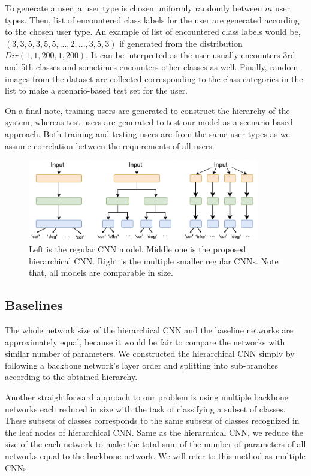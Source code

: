 To generate a user, a user type is chosen uniformly randomly between $m$ user types. 
Then, list of encountered class labels for the user are generated according to the chosen user type. 
An example of list of encountered class labels would be, $(3,3,5,3,5,5,...,2,...,3,5,3)$ if generated from the distribution $Dir(1,1,200,1,200)$. 
It can be interpreted as the user usually encounters 3rd and 5th classes and sometimes encounters other classes as well.
Finally, random images from the dataset are collected corresponding to the class categories in the list to make a scenario-based test set for the user.

On a final note, training users are generated to construct the hierarchy of the system, whereas test users are generated to test our model as a scenario-based approach. 
Both training and testing users are from the same user types as we assume correlation between the requirements of all users. 

\begin{figure}
    \centering
    \includegraphics[width=0.9\textwidth]{thesis/images/classification_baselines-fig.png}
    \caption{Left is the regular CNN model. Middle one is the proposed hierarchical CNN. Right is the multiple smaller regular CNNs. Note that, all models are comparable in size.}
    \label{fig:baselines}
\end{figure}

\subsection{Baselines}
\label{ssec:baselines}
The whole network size of the hierarchical CNN and the baseline networks are approximately equal, because it would be fair to compare the networks with similar number of parameters. 
We constructed the hierarchical CNN simply by following a backbone network's layer order and splitting into sub-branches according to the obtained hierarchy. 

Another straightforward approach to our problem is using multiple backbone networks each reduced in size with the task of classifying a subset of classes. 
These subsets of classes corresponds to the same subsets of classes recognized in the leaf nodes of hierarchical CNN.
Same as the hierarchical CNN, we reduce the size of the each network to make the total sum of the number of parameters of all networks equal to the backbone network. 
We will refer to this method as multiple CNNs. 

